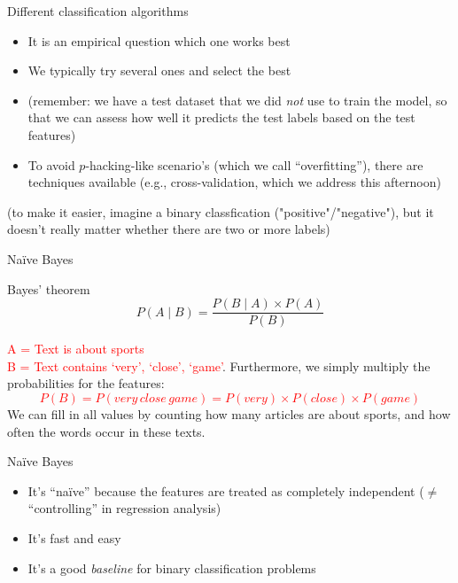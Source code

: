 \documentclass[compress]{beamer}
\begin{document}
\begin{frame}[plain]
\begin{columns}[]
		
	\end{columns}
	
\end{frame}





\begin{frame}{Different classification algorithms}

\begin{itemize}[<+->]
	\item It is an empirical question which one works best
	\item We typically try several ones and select the best
	\item (remember: we have a test dataset that we did \emph{not} use to train the model, so that we can assess how well it predicts the test labels based on the test features)
	\item To avoid $p$-hacking-like scenario's (which we call ``overfitting''), there are techniques available (e.g., cross-validation, which we address this afternoon)
\end{itemize}
(to make it easier, imagine a binary classfication ("positive"/"negative"), but it doesn't really matter whether there are two or more labels)
\end{frame}






\begin{frame}{Naïve Bayes}
	\begin{block}{Bayes' theorem}
		$$ P(A \mid B) = \frac{P(B \mid A) \times P(A)}{P(B)} $$
	\end{block}
	\pause
	\textcolor{red}{A = Text is about sports\\
		B = Text contains `very', `close', `game'}.
	\pause
	Furthermore, we simply multiply the probabilities for the features:
	\textcolor{red}{$$P(B) = P(very\, close\, game) = P(very) \times P(close) \times P(game)$$}
	We can fill in all values by counting how many articles are about sports, and how often the words occur in these texts.
	\vspace{0.3cm}
\end{frame}

\begin{frame}{Naïve Bayes}
	\begin{itemize}[<+->]
		\item It's ``naïve'' because the features are treated as completely independent ($\neq$ ``controlling'' in regression analysis)
		\item It's fast and easy
		\item It's a good \emph{baseline} for binary classification problems
	\end{itemize}
\end{frame}
\end{document}
